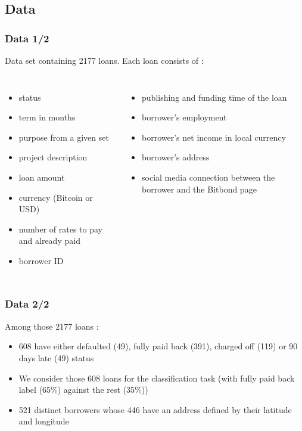 \documentclass[10pt,handout,english]{beamer}
\begin{document}
		\subsection{Data}
		\begin{frame}
		\frametitle{Data 1/2}
			Data set containing 2177 loans. Each loan consists of :
			\begin{columns}[c]
					\begin{itemize}
						\item status
						\item term in months
						\item purpose from a given set
						\item project description
						\item loan amount
						\item currency (Bitcoin or USD)
						\item number of rates to pay and already paid
						\item borrower ID
					\end{itemize}
					\begin{itemize}
						\item publishing and funding time of the loan
						\item borrower's employment
						\item borrower's net income in local currency
						\item borrower's address
						\item social media connection between the borrower and the Bitbond page
					\end{itemize}
			\end{columns}
		\end{frame}

		\begin{frame}
		\frametitle{Data 2/2}
			Among those 2177 loans :
			\begin{itemize}
				\item 608 have either defaulted (49), fully paid back (391), charged off (119) or 90 days late (49) status
				\item We consider those 608 loans for the classification task (with fully paid back label (65\%) against the rest (35\%))
				\item 521 distinct borrowers whose 446 have an address defined by their latitude and longitude
			\end{itemize}
		\end{frame}
\end{document}

